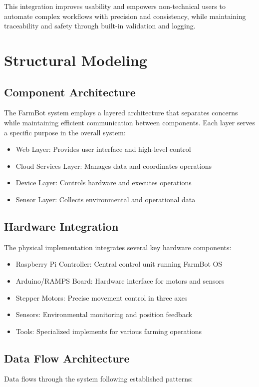This integration improves usability and empowers non-technical users to automate complex workflows with precision and consistency, while maintaining traceability and safety through built-in validation and logging.

\section{Structural Modeling}

\subsection{Component Architecture}
The FarmBot system employs a layered architecture that separates concerns while maintaining efficient communication between components. Each layer serves a specific purpose in the overall system:

\begin{itemize}
    \item Web Layer: Provides user interface and high-level control
    \item Cloud Services Layer: Manages data and coordinates operations
    \item Device Layer: Controls hardware and executes operations
    \item Sensor Layer: Collects environmental and operational data
\end{itemize}

\subsection{Hardware Integration}
The physical implementation integrates several key hardware components:

\begin{itemize}
    \item Raspberry Pi Controller: Central control unit running FarmBot OS
    \item Arduino/RAMPS Board: Hardware interface for motors and sensors
    \item Stepper Motors: Precise movement control in three axes
    \item Sensors: Environmental monitoring and position feedback
    \item Tools: Specialized implements for various farming operations
\end{itemize}

\subsection{Data Flow Architecture}
Data flows through the system following established patterns:

